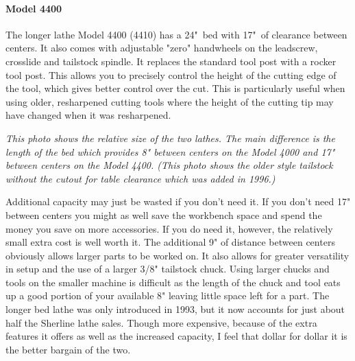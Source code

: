 \paragraph{Model 4400}

The longer lathe Model 4400 (4410) has a 24"\ bed with 17"\ of clearance
between centers. It also comes with adjustable "zero" handwheels on the
leadscrew, crosslide and tailstock spindle. It replaces the standard tool
post with a rocker tool post. This allows you to precisely control the height of
the cutting edge of the tool, which gives better control over the cut. This is
particularly useful when using older, resharpened cutting tools where the height
of the cutting tip may have changed when it was resharpened.

\bigskip
\textit{This photo shows the relative size of the two lathes. The main
difference is the length of the bed which provides 8" between centers on the
Model 4000 and 17" between centers on the Model 4400. (This photo shows the
older style tailstock without the cutout for table clearance which was added in
1996.)}
\bigskip


Additional capacity may just be wasted if you don't need it. If you don't need
17" between centers you might as well save the workbench space and spend the
money you save on more accessories. If you do need it, however, the relatively
small extra cost is well worth it. The additional 9" of distance between centers
obviously allows larger parts to be worked on. It also allows for greater
versatility in setup and the use of a larger 3/8" tailstock chuck. Using larger
chucks and tools on the smaller machine is difficult as the length of the chuck
and tool eats up a good portion of your available 8" leaving little space left
for a part. The longer bed lathe was only introduced in 1993, but it now
accounts for just about half the Sherline lathe sales. Though more expensive,
because of the extra features it offers as well as the increased capacity, I
feel that dollar for dollar it is the better bargain of the two.


